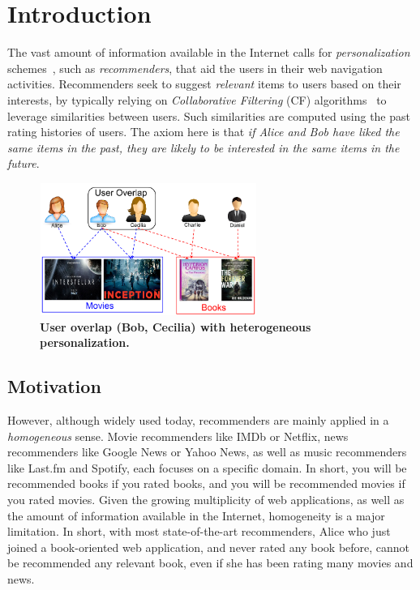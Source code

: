 \section{Introduction}
\label{intro}
The vast amount of information available in the Internet calls for \emph{personalization} schemes~\cite{bonett2001personalization}, such as \emph{recommenders}, that aid the users in their web navigation activities. Recommenders seek to suggest \emph{relevant} items to users based on their interests, by typically relying on \emph{Collaborative Filtering} (CF) algorithms~\cite{resnick1994grouplens} to leverage similarities between users. Such similarities are computed using the past rating histories of users. The axiom here is that  \emph{if Alice and Bob have liked the same items in the past, they are likely to be interested in the same items in the future}. 


\begin{figure}
\begin{center}
\includegraphics[height=1.7in,width=2.8in]{figures/Overlap.png}
\vspace{-4mm}
\caption{{\bf User overlap (Bob, Cecilia) with heterogeneous personalization.}}
\label{fig:overlap}
\end{center}
\end{figure}

\subsection{Motivation}


However, although widely used today, recommenders are mainly applied in a \emph{homogeneous} sense. Movie recommenders like IMDb or Netflix, news recommenders  like Google News or Yahoo News, as well as music recommenders  like Last.fm and Spotify, each focuses on a specific domain. In short, you will be recommended books if you rated books, and you will be recommended movies if you rated movies. Given the growing multiplicity of web applications, as well as  the amount of information available in the Internet, homogeneity is a major limitation. In short, with most state-of-the-art recommenders, Alice who just joined a book-oriented web application, and never rated any book before, cannot be recommended any relevant book, even if she has been rating many movies and news.

